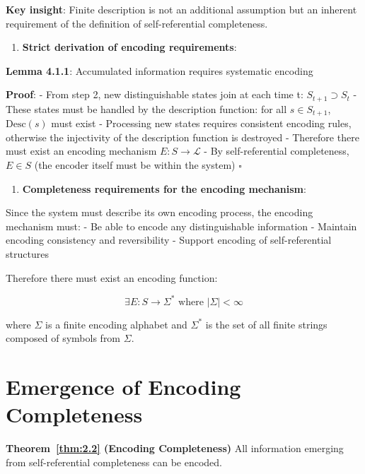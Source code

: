    \textbf{Key insight}: Finite description is not an additional assumption but an inherent requirement of the definition of self-referential completeness.

\begin{enumerate}
\item \textbf{Strict derivation of encoding requirements}:
\end{enumerate}
   \textbf{Lemma 4.1.1}: Accumulated information requires systematic encoding
\label{thm:2.1}
   
   \textbf{Proof}:
   - From step 2, new distinguishable states join at each time t: $S_{t+1} \supset S_t$
   - These states must be handled by the description function: for all $s \in S_{t+1}$, $\text{Desc}(s)$ must exist
   - Processing new states requires consistent encoding rules, otherwise the injectivity of the description function is destroyed
   - Therefore there must exist an encoding mechanism $E: S \to \mathcal{L}$
   - By self-referential completeness, $E \in S$ (the encoder itself must be within the system) $\square$

\begin{enumerate}
\item \textbf{Completeness requirements for the encoding mechanism}:
\end{enumerate}
   Since the system must describe its own encoding process, the encoding mechanism must:
   - Be able to encode any distinguishable information
   - Maintain encoding consistency and reversibility
   - Support encoding of self-referential structures

   Therefore there must exist an encoding function:
   
\begin{equation}
\exists E: S \rightarrow \Sigma^* \text{ where } |\Sigma| < \infty
\end{equation}
   
   where $\Sigma$ is a finite encoding alphabet and $\Sigma^*$ is the set of all finite strings composed of symbols from $\Sigma$.

\section{Emergence of Encoding Completeness}
\label{sec:ch04_encoding:emergence-of-encoding-completeness}

\textbf{Theorem~\ref{thm:2.2} (Encoding Completeness)}
\label{thm:2.2}
All information emerging from self-referential completeness can be encoded.

